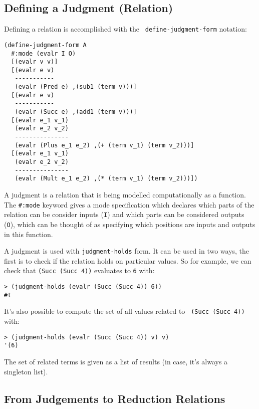 \subsection{Defining a Judgment (Relation)}

Defining a relation is accomplished with the {\tt
  define-judgment-form} notation:
\begin{verbatim}
(define-judgment-form A
  #:mode (evalr I O)
  [(evalr v v)]
  [(evalr e v)
   -----------
   (evalr (Pred e) ,(sub1 (term v)))]
  [(evalr e v)
   -----------
   (evalr (Succ e) ,(add1 (term v)))]
  [(evalr e_1 v_1)
   (evalr e_2 v_2)
   ---------------
   (evalr (Plus e_1 e_2) ,(+ (term v_1) (term v_2)))]
  [(evalr e_1 v_1)
   (evalr e_2 v_2)
   ---------------
   (evalr (Mult e_1 e_2) ,(* (term v_1) (term v_2)))])
\end{verbatim}

A judgment is a relation that is being modelled computationally as a
function.  The {\tt \#:mode} keyword gives a mode specification which
declares which parts of the relation can be consider inputs ({\tt I})
and which parts can be considered outputs ({\tt O}), which can be
thought of as specifying which positions are inputs and outputs in
this function.

A judgment is used with {\tt judgment-holds} form.  It can be used in
two ways, the first is to check if the relation holds on particular
values.  So for example, we can check that {\tt (Succ (Succ 4))}
evaluates to {\tt 6} with:
\begin{verbatim}
> (judgment-holds (evalr (Succ (Succ 4)) 6))
#t
\end{verbatim}
It's also possible to compute the set of all values related to {\tt
  (Succ (Succ 4))} with:
\begin{verbatim}
> (judgment-holds (evalr (Succ (Succ 4)) v) v)
'(6)
\end{verbatim}
The set of related terms is given as a list of results (in case, it's
always a singleton list).

\subsection{From Judgements to Reduction Relations}

